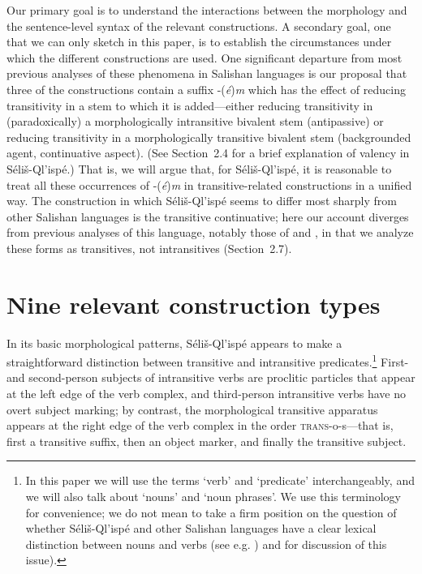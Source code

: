 \documentclass[output=paper,colorlinks,citecolor=brown]{langscibook}
\begin{document}
  Our primary goal is to understand the interactions between the
  morphology and the sentence-level syntax of the relevant
  constructions.  A secondary goal, one that we can only sketch in
  this paper, is to establish the circumstances under which the
  different constructions are used.  One significant departure from
  most previous analyses of these phenomena in Salishan languages is
  our proposal that three of the constructions contain a suffix
  -(\emph{\'e})\emph{m} which has the effect of reducing transitivity
  in a stem to which it is added---either reducing transitivity in
  (paradoxically) a morphologically intransitive bivalent stem
  (antipassive) or reducing transitivity in a morphologically
  transitive bivalent stem (backgrounded agent, continuative aspect).
  (See Section~2.4 for a brief explanation of valency in
  S\'eli\v{s}-Ql'isp\'e.) That is, we will argue that, for
  S\'eli\v{s}-Ql'isp\'e, it is reasonable to treat all these
  occurrences of -(\emph{\'e})\emph{m} in transitive-related
  constructions in a unified way.  The construction in which
  S\'eli\v{s}-Ql'isp\'e seems to differ most sharply from other
  Salishan languages is the transitive continuative; here our account
  diverges from previous analyses of this language, notably those of
  \cite{Kroeber:1999} and \cite{Vogt:1940}, in
  that we analyze these
  forms as transitives, not intransitives (Section~2.7).

\section{Nine relevant construction types}

In its basic morphological patterns, S\'eli\v{s}-Ql'isp\'e appears to
make a straightforward distinction between transitive and intransitive
predicates.\footnote{In this paper we will use the terms `verb' and
`predicate' interchangeably, and we will also talk about `nouns' and
`noun phrases'.  We use this terminology for convenience; we do not
mean to take a firm position on the question of whether
S\'eli\v{s}-Ql'isp\'e and other Salishan languages have a clear
lexical distinction between nouns and verbs (see e.g. \cite{Kinkade:1983}) and
\cite{vanEijk&Hess:1986} for discussion of this issue).}  First- and
second-person subjects of intransitive verbs are proclitic particles
that appear at the left edge of the verb complex, and third-person
intransitive verbs have no overt subject marking; by contrast, the
morphological transitive apparatus appears at the right edge of the
verb complex in the order \textsc{trans}-o-s---that is, first a
transitive suffix, then an object marker, and finally the transitive
subject.
\end{document}
